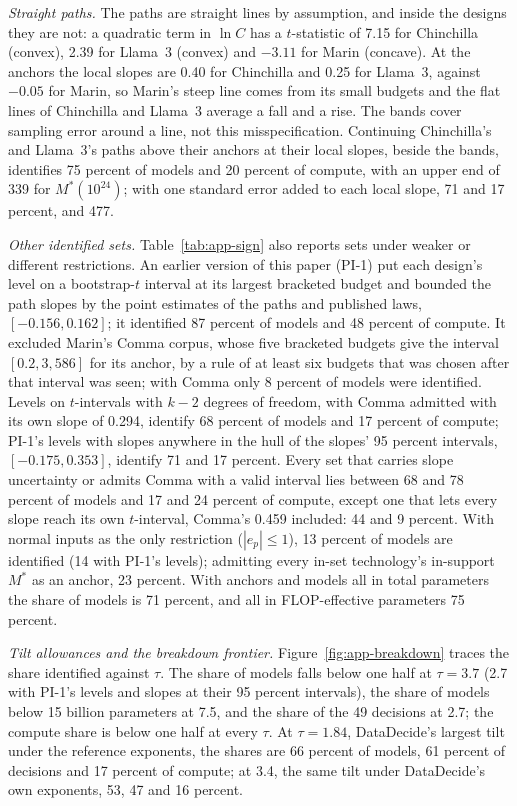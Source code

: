 \textit{Straight paths.} The paths are straight lines by assumption, and inside the designs they are not: a quadratic
term in $\ln C$ has a $t$-statistic of 7.15 for Chinchilla (convex), 2.39 for Llama~3 (convex) and $-3.11$ for Marin
(concave). At the anchors the local slopes are 0.40 for Chinchilla and 0.25 for Llama~3, against $-0.05$ for Marin, so
Marin's steep line comes from its small budgets and the flat lines of Chinchilla and Llama~3 average a fall and a rise. The
bands cover sampling error around a line, not this misspecification. Continuing Chinchilla's and Llama~3's paths above
their anchors at their local slopes, beside the bands, identifies 75 percent of models and 20 percent of compute, with an
upper end of 339 for $M^*(10^{24})$; with one standard error added to each local slope, 71 and 17 percent, and 477.

\textit{Other identified sets.} Table~\ref{tab:app-sign} also reports sets under weaker or different restrictions.
An earlier version of this paper (PI-1) put each design's level on a bootstrap-$t$ interval at its largest bracketed
budget and bounded the path slopes by the point estimates of the paths and published laws, $[-0.156,0.162]$; it
identified 87 percent of models and 48 percent of compute. It excluded Marin's Comma corpus, whose five bracketed budgets
give the interval $[0.2,3{,}586]$ for its anchor, by a rule of at least six budgets that was chosen after that interval
was seen; with Comma only 8 percent of models were identified. Levels on $t$-intervals with $k-2$ degrees of freedom,
with Comma admitted with its own slope of 0.294, identify 68 percent of models and 17 percent of compute; PI-1's levels
with slopes anywhere in the hull of the slopes' 95 percent intervals, $[-0.175,0.353]$, identify 71 and 17 percent. Every
set that carries slope uncertainty or admits Comma with a valid interval lies between 68 and 78 percent of models and 17
and 24 percent of compute, except one that lets every slope reach its own $t$-interval, Comma's 0.459 included: 44 and 9
percent. With normal inputs as the only restriction ($|e_p|\le1$), 13 percent of models are identified (14 with PI-1's
levels); admitting every in-set technology's in-support $M^*$ as an anchor, 23 percent. With anchors and models all in
total parameters the share of models is 71 percent, and all in FLOP-effective parameters 75 percent.

\textit{Tilt allowances and the breakdown frontier.} Figure~\ref{fig:app-breakdown} traces the share identified against
$\tau$. The share of models falls below one half at $\tau=3.7$ (2.7 with PI-1's levels and slopes at their 95 percent
intervals), the share of models below 15 billion parameters at 7.5, and the share of the 49 decisions at 2.7; the compute
share is below one half at every $\tau$. At $\tau=1.84$, DataDecide's largest tilt under the reference exponents, the
shares are 66 percent of models, 61 percent of decisions and 17 percent of compute; at 3.4, the same tilt under
DataDecide's own exponents, 53, 47 and 16 percent.

